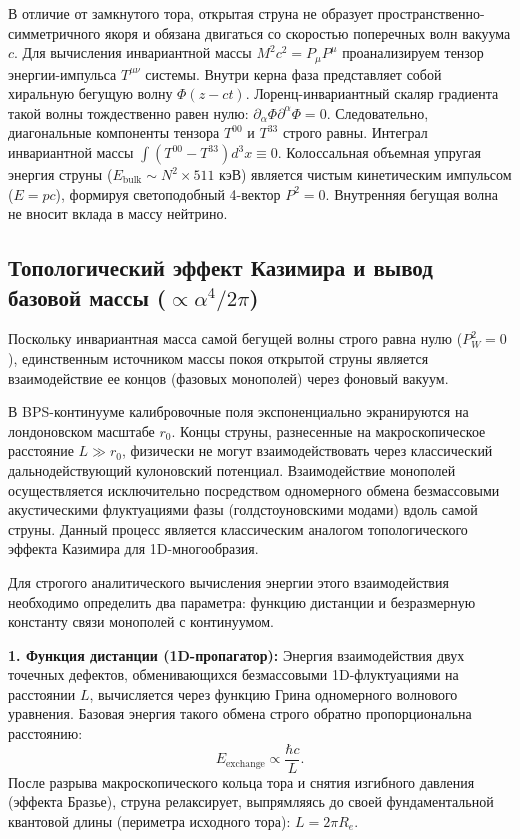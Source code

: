 \documentclass[11pt,a4paper]{article}
\begin{document}
	В отличие от замкнутого тора, открытая струна не образует пространственно-симметричного якоря и обязана двигаться со скоростью поперечных волн вакуума $c$. Для вычисления инвариантной массы $M^2 c^2 = P_\mu P^\mu$ проанализируем тензор энергии-импульса $T^{\mu\nu}$ системы.
	Внутри керна фаза представляет собой хиральную бегущую волну $\Phi(z-ct)$. Лоренц-инвариантный скаляр градиента такой волны тождественно равен нулю: $\partial_\alpha \Phi \partial^\alpha \Phi = 0$. 
	Следовательно, диагональные компоненты тензора $T^{00}$ и $T^{33}$ строго равны. Интеграл инвариантной массы $\int (T^{00} - T^{33}) d^3x \equiv 0$. Колоссальная объемная упругая энергия струны ($E_{\text{bulk}} \sim N^2 \times 511$ кэВ) является чистым кинетическим импульсом ($E = pc$), формируя светоподобный 4-вектор $P^2 = 0$. Внутренняя бегущая волна не вносит вклада в массу нейтрино.
	
	\subsection{Топологический эффект Казимира и вывод базовой массы ($\propto \alpha^4 / 2\pi$)}
	Поскольку инвариантная масса самой бегущей волны строго равна нулю ($P_W^2 = 0$), единственным источником массы покоя открытой струны является взаимодействие ее концов (фазовых монополей) через фоновый вакуум. 
	
	В BPS-континууме калибровочные поля экспоненциально экранируются на лондоновском масштабе $r_0$. Концы струны, разнесенные на макроскопическое расстояние $L \gg r_0$, физически не могут взаимодействовать через классический дальнодействующий кулоновский потенциал. Взаимодействие монополей осуществляется исключительно посредством одномерного обмена безмассовыми акустическими флуктуациями фазы (голдстоуновскими модами) вдоль самой струны. Данный процесс является классическим аналогом топологического эффекта Казимира для 1D-многообразия.
	
	Для строгого аналитического вычисления энергии этого взаимодействия необходимо определить два параметра: функцию дистанции и безразмерную константу связи монополей с континуумом.
	
	\textbf{1. Функция дистанции (1D-пропагатор):}
	Энергия взаимодействия двух точечных дефектов, обменивающихся безмассовыми 1D-флуктуациями на расстоянии $L$, вычисляется через функцию Грина одномерного волнового уравнения. Базовая энергия такого обмена строго обратно пропорциональна расстоянию:
	\begin{equation}
		E_{\text{exchange}} \propto \frac{\hbar c}{L}.
	\end{equation}
	После разрыва макроскопического кольца тора и снятия изгибного давления (эффекта Бразье), струна релаксирует, выпрямляясь до своей фундаментальной квантовой длины (периметра исходного тора): $L = 2\pi R_e$.
	
\end{document}
